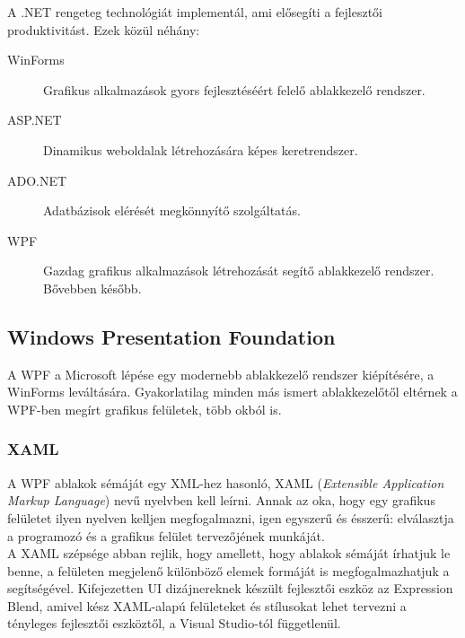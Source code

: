 \documentclass[a4paper,12pt]{report}
\begin{document}
A .NET rengeteg technológiát implementál, ami elősegíti a fejlesztői produktivitást. Ezek közül néhány:
\begin{description}
    \item[WinForms] Grafikus alkalmazások gyors fejlesztéséért felelő ablakkezelő rendszer.
    \item[ASP.NET] Dinamikus weboldalak létrehozására képes keretrendszer.
    \item[ADO.NET] Adatbázisok elérését megkönnyítő szolgáltatás.
    \item[WPF] Gazdag grafikus alkalmazások létrehozását segítő ablakkezelő rendszer. Bővebben később.
\end{description}



\subsection{Windows Presentation Foundation}

A WPF a Microsoft lépése egy modernebb ablakkezelő rendszer kiépítésére, a WinForms leváltására. Gyakorlatilag minden más ismert ablakkezelőtől eltérnek a WPF-ben megírt grafikus felületek, több okból is.

\subsubsection{XAML}
A WPF ablakok sémáját egy XML-hez hasonló, XAML (\textit{Extensible Application Markup Language}) nevű nyelvben kell leírni. Annak az oka, hogy egy grafikus felületet ilyen nyelven kelljen megfogalmazni, igen egyszerű és ésszerű: elválasztja a programozó és a grafikus felület tervezőjének munkáját. \\
A XAML szépsége abban rejlik, hogy amellett, hogy ablakok sémáját írhatjuk le benne, a felületen megjelenő különböző elemek formáját is megfogalmazhatjuk a segítségével. Kifejezetten UI dizájnereknek készült fejlesztői eszköz az Expression Blend, amivel kész XAML-alapú felületeket és stílusokat lehet tervezni a tényleges fejlesztői eszköztől, a Visual Studio-tól függetlenül.
\end{document}
